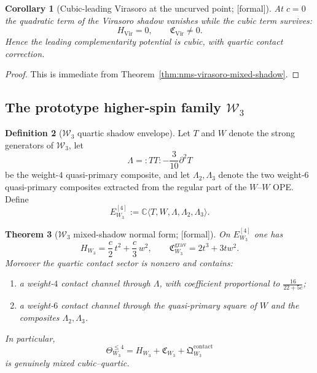 \documentclass[11pt,oneside]{memoir}
\numberwithin{equation}{chapter}
\newtheorem{theorem}{Theorem}[chapter]
\newtheorem{corollary}[theorem]{Corollary}
\theoremstyle{definition}
\newtheorem{definition}[theorem]{Definition}
\newcommand{\ClaimStatusProvedHere}{\textnormal{[formal]}}
\begin{document}
\begin{corollary}[Cubic-leading Virasoro at the uncurved point; \ClaimStatusProvedHere]
\label{cor:nms-virasoro-cubic-leading}
At $c=0$ the quadratic term of the Virasoro shadow vanishes while the cubic term survives:
\[
H_{\mathrm{Vir}}=0,
\qquad
\mathfrak C_{\mathrm{Vir}}\neq 0.
\]
Hence the leading complementarity potential is cubic, with quartic contact correction.
\end{corollary}

\begin{proof}
This is immediate from Theorem~\ref{thm:nms-virasoro-mixed-shadow}.\qedhere
\end{proof}

\subsection{The prototype higher-spin family \texorpdfstring{$\mathcal W_3$}{W3}}
\label{subsec:nms-w3}

\begin{definition}[\texorpdfstring{$\mathcal W_3$}{W3} quartic shadow envelope]
\label{def:nms-w3-envelope}
Let $T$ and $W$ denote the strong generators of $\mathcal W_3$, let
\[
\Lambda=:TT:-\frac{3}{10}\partial^2T
\]
be the weight-$4$ quasi-primary composite, and let $\Lambda_2,\Lambda_3$ denote the two weight-$6$ quasi-primary composites extracted from the regular part of the $W$--$W$ OPE.  Define
\[
E^{[4]}_{W_3}:=\mathbb C\langle T,W,\Lambda,\Lambda_2,\Lambda_3\rangle.
\]
\end{definition}

\begin{theorem}[\texorpdfstring{$\mathcal W_3$}{W3} mixed-shadow normal form; \ClaimStatusProvedHere]
\label{thm:nms-w3-mixed-shadow-normal-form}
On $E^{[4]}_{W_3}$ one has
\[
H_{W_3}=\frac c2\,t^2+\frac c3\,w^2,
\qquad
\mathfrak C^{\mathrm{grav}}_{W_3}=2t^3+3tw^2.
\]
Moreover the quartic contact sector is nonzero and contains:
\begin{enumerate}[label=\textup{(\roman*)}]
\item a weight-$4$ contact channel through $\Lambda$, with coefficient proportional to $\frac{16}{22+5c}$;
\item a weight-$6$ contact channel through the quasi-primary square of $W$ and the composites $\Lambda_2,\Lambda_3$.
\end{enumerate}
In particular,
\[
\Theta_{W_3}^{\le 4}=H_{W_3}+\mathfrak C_{W_3}+\mathfrak Q_{W_3}^{\mathrm{contact}}
\]
is genuinely mixed cubic--quartic.
\end{theorem}
\end{document}
